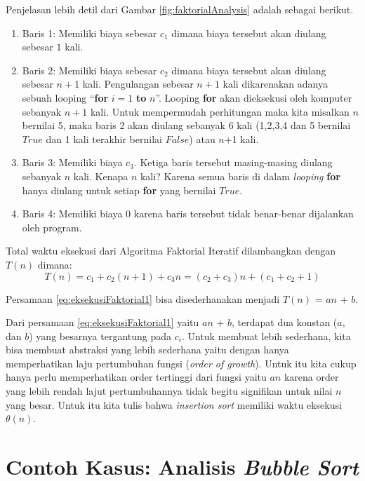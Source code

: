 \FloatBarrier
Penjelasan lebih detil dari Gambar \ref{fig:faktorialAnalysis} adalah sebagai berikut.
\begin{enumerate}
	\item Baris 1: Memiliki biaya sebesar $c_1$ dimana biaya tersebut akan diulang sebesar $1$ kali.  
	\item Baris 2: Memiliki biaya sebesar $c_2$ dimana biaya tersebut akan diulang sebesar $n+1$ kali. Pengulangan sebesar $n+1$ kali dikarenakan adanya sebuah looping ``\textbf{for} $i=1$ \textbf{to} $n$''. Looping \textbf{for} akan dieksekusi oleh komputer sebanyak $n+1$ kali. Untuk mempermudah perhitungan maka kita misalkan $n$ bernilai 5, maka baris 2 akan diulang sebanyak 6 kali (1,2,3,4 dan 5 bernilai $True$ dan 1 kali terakhir bernilai $False$) atau $n$+1 kali.
	\item Baris 3: Memiliki biaya $c_{3}$. Ketiga baris tersebut masing-masing diulang sebanyak $n$ kali. Kenapa $n$ kali? Karena semua baris di dalam \textit{looping} \textbf{for} hanya diulang untuk setiap \textbf{for} yang bernilai $True$.
	\item Baris 4: Memiliki biaya 0 karena baris tersebut tidak benar-benar dijalankan oleh program.
\end{enumerate}

Total waktu eksekusi dari Algoritma Faktorial Iteratif dilambangkan dengan $T(n)$ dimana:
\begin{equation}
\label{eq:eksekusiFaktorial1}
T(n) = c_{1} + c_{2}(n+1) + c_3{n} = (c_{2}+c_{3})n + (c_{1}+c_{2}+1)
\end{equation} 

Persamaan \ref{eq:eksekusiFaktorial1} bisa disederhanakan menjadi $T(n)$ = $an$ + $b$. 


Dari persamaan \ref{eq:eksekusiFaktorial1} yaitu $an$ + $b$, terdapat dua konstan ($a$, dan $b$) yang besarnya tergantung pada $c_i$. Untuk membuat lebih sederhana, kita bisa membuat abstraksi yang lebih sederhana yaitu dengan hanya memperhatikan laju pertumbuhan fungsi (\textit{order of growth}). Untuk itu kita cukup hanya perlu memperhatikan order tertinggi dari fungsi yaitu $an$ karena order yang lebih rendah lajut pertumbuhannya tidak begitu signifikan untuk nilai $n$ yang besar. Untuk itu kita tulis bahwa \textit{insertion sort} memiliki waktu eksekusi $\theta(n)$.

\section{Contoh Kasus: Analisis \textit{Bubble Sort}}


